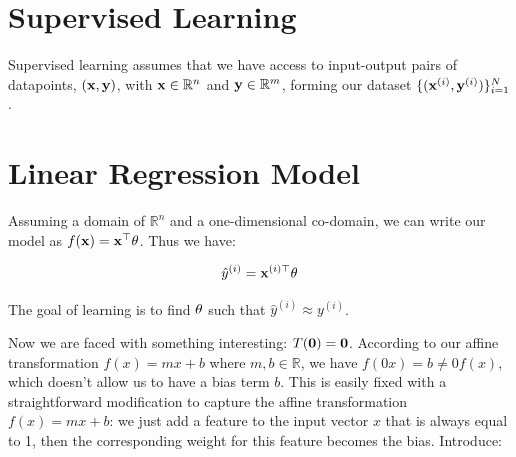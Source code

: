 \section{Supervised Learning}
Supervised learning assumes that we have access to input-output pairs of datapoints, $(\mathbf{x}, \mathbf{y})$, with $\mathbf{x} \in \mathbb{R}^n$ and $\mathbf{y} \in \mathbb{R}^m$, forming our dataset $\{(\mathbf{x}^{(i)}, \mathbf{y}^{(i)})\}_{i=1}^N$.


\section{Linear Regression Model}
Assuming a domain of $\mathbb{R}^n$ and a one-dimensional co-domain, we can write our model as $f(\mathbf{x}) = \mathbf{x}^\top \mathbf{\theta}$. Thus we have:




\[
    \hat{y}^{(i)} = \mathbf{x}^{(i)\top} \mathbf{\theta}
\]

The goal of learning is to find $\mathbf{\theta}$ such that $\hat{y}^{(i)} \approx y^{(i)}$. 






Now we are faced with something interesting: $T(\mathbf{0}) = \mathbf{0}$. According to our affine transformation $f(x) = mx+b $ where $m,b \in \mathbb{R}$, we have $f(0x) = b \neq 0f(x)$, which doesn't allow us to have a bias term $b$. This is easily fixed with a straightforward modification to capture the affine transformation $f(x) = mx + b$: we just add a feature to the input vector $x$ that is always equal to 1, then the corresponding weight for this feature becomes the bias. Introduce:

